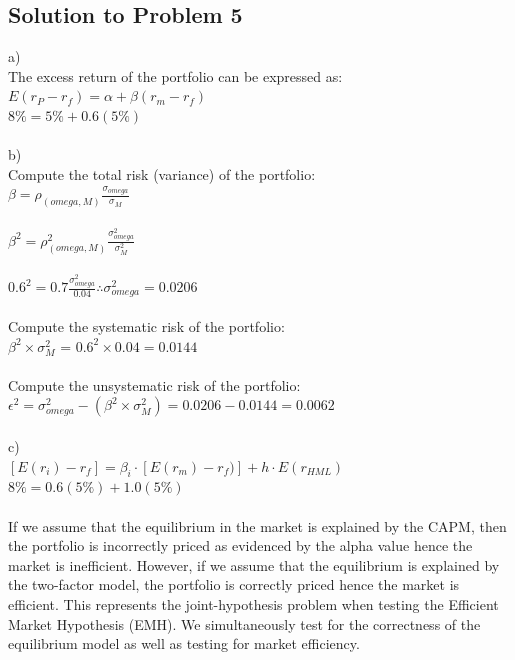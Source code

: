 \documentclass[12]{article}
\begin{document}
\subsection*{Solution to Problem 5}
a)\\
The excess return of the portfolio can be expressed as:\\
$E(r_P - r_f) = \alpha + \beta(r_m - r_f)$\\
$8\%  = 5\% + 0.6(5\%)$\\
\\
b)\\
Compute the total risk (variance) of the portfolio:\\
{\large $\beta = \rho_{(omega,M)}\frac{\sigma_{omega}}{\sigma_M}$}\\
\\
{\large $\beta^2 = \rho_{(omega,M)}^2 \frac{\sigma_{omega}^2}{\sigma_M^2}$}\\
\\
{\large $0.6^2 = 0.7 \frac{\sigma_{omega}^2}{0.04} \therefore \sigma_{omega}^2 = 0.0206$}\\
\\
Compute the systematic risk of the portfolio:\\
$\beta^2 \times \sigma_M^2$ = $0.6^2 \times 0.04 = 0.0144$\\
\\
Compute the unsystematic risk of the portfolio:\\
$\epsilon^2 = \sigma_{omega}^2 - (\beta^2 \times \sigma_M^2) = 0.0206 - 0.0144 = 0.0062$\\
\\
c)\\
$[E(r_i) - r_f] = \beta_i\cdot[E(r_m) - r_f)] + h\cdot E(r_{HML})$\\
$ 8\%= 0.6(5\%) + 1.0(5\%)$\\
\\
If we assume that the equilibrium in the market is explained by the CAPM, then the portfolio is incorrectly priced as evidenced by the alpha value hence the market is inefficient.
However, if we assume that the equilibrium is explained by the two-factor model, the portfolio is correctly priced hence the market is efficient.
This represents the joint-hypothesis problem when testing the Efficient Market Hypothesis (EMH). We simultaneously test for the correctness of the equilibrium model as well as testing for market efficiency.


\color{black}
\end{document}
